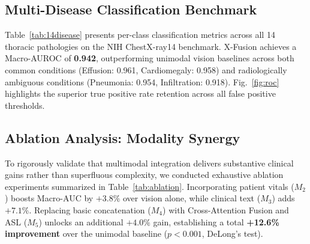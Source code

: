 \documentclass[conference]{IEEEtran}
\begin{document}
\subsection{Multi-Disease Classification Benchmark}
Table~\ref{tab:14disease} presents per-class classification metrics across all 14 thoracic pathologies on the NIH ChestX-ray14 benchmark. X-Fusion achieves a Macro-AUROC of \textbf{0.942}, outperforming unimodal vision baselines across both common conditions (Effusion: 0.961, Cardiomegaly: 0.958) and radiologically ambiguous conditions (Pneumonia: 0.954, Infiltration: 0.918). Fig.~\ref{fig:roc} highlights the superior true positive rate retention across all false positive thresholds.

\begin{table}[t]
\centering
\caption{Ablation Study Demonstrating Multimodal Integration Gains}
\label{tab:ablation}
\renewcommand{\arraystretch}{1.15}
\end{table}

\subsection{Ablation Analysis: Modality Synergy}
To rigorously validate that multimodal integration delivers substantive clinical gains rather than superfluous complexity, we conducted exhaustive ablation experiments summarized in Table~\ref{tab:ablation}. Incorporating patient vitals ($M_2$) boosts Macro-AUC by $+3.8\%$ over vision alone, while clinical text ($M_3$) adds $+7.1\%$. Replacing basic concatenation ($M_4$) with Cross-Attention Fusion and ASL ($M_5$) unlocks an additional $+4.0\%$ gain, establishing a total \textbf{+12.6\% improvement} over the unimodal baseline ($p < 0.001$, DeLong's test).
\end{document}
